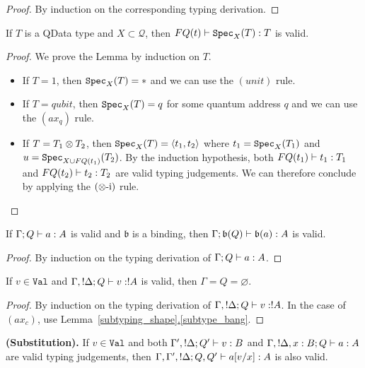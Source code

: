 \documentclass{article}
\begin{document}
\begin{proof}
By induction on the corresponding typing derivation.
\end{proof}

\begin{lemma}
\label{specimen}
If $T$ is a QData type and $X\subset \mathcal{Q}$, then 
$FQ(t)\vdash \texttt{Spec}_X(T):T$ is valid.
\end{lemma}

\begin{proof}
We prove the Lemma by induction on $T$.
  \begin{itemize}
    \item If $T=1$, then $\texttt{Spec}_X(T)=*$ and we can use the $(unit)$ rule.
    \item If $T=qubit$, then $\texttt{Spec}_X(T)=q$ for some quantum address $q$ and we can 
          use the $(ax_q)$ rule.
    \item If $T=T_1\otimes T_2$, then $\texttt{Spec}_X(T)=\langle t_1,t_2\rangle$ where $t_1=\texttt{Spec}_X(T_1)$ 
          and $u=\texttt{Spec}_{X\cup FQ(t_1)}(T_2)$. By the induction hypothesis, both 
          $FQ(t_1)\vdash t_1:T_1$ and $FQ(t_2)\vdash t_2:T_2$ are valid typing 
          judgements. We can therefore conclude by applying the $(\otimes\mbox{-i})$ rule.
  \end{itemize}
\end{proof}

\begin{lemma}
\label{binding_judgement}
If $\Gamma;Q \vdash a:A$ is valid and $\mathfrak{b}$ is a 
binding, then $\Gamma;\mathfrak{b} (Q) \vdash \mathfrak{b}(a):A$ is valid.
\end{lemma}

\begin{proof}
By induction on the typing derivation of $\Gamma;Q \vdash a:A$.
\end{proof}

\begin{lemma}
\label{context_value}
If $v\in\mathtt{Val}$ and $\Gamma,!\Delta;Q \vdash v:!A$ is valid, 
then $\Gamma=Q=\varnothing$.
\end{lemma}

\begin{proof}
By induction on the typing derivation of $\Gamma,!\Delta;Q \vdash v:!A$. 
In the case of $(ax_c)$, use Lemma~\hyperref[subtype_bang]{\ref*{subtyping_shape}.\ref*{subtype_bang}}.
\end{proof}

\begin{lemma}
{\bf (Substitution).}
\label{substitution}
If $v\in\mathtt{Val}$ and both $\Gamma',!\Delta;Q' \vdash v:B$ and 
$\Gamma,!\Delta,x:B;Q \vdash a:A$ are valid typing judgements, 
then $\Gamma,\Gamma',!\Delta;Q,Q' \vdash a[v/x]:A$ is also valid.
\end{lemma}
\end{document}

